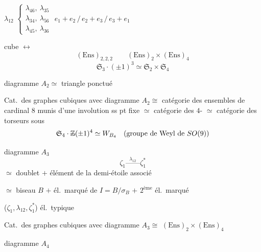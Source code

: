 \documentclass[11pt,a4paper]{article}
\begin{document}


$\lambda_{12}$ \quad
$\left\{\begin{array}{l}\lambda_{46},\ \lambda_{35} \\ \lambda_{34},\ \lambda_{56} \\ \lambda_{45},\ \lambda_{36}\end{array}\right.$
\qquad $e_1 + e_2 \,/\, e_2 + e_3 \,/\, e_3 + e_1$

cube $\longleftrightarrow$ 
\[
(\mathrm{Ens})_{2,2,2} \qquad (\mathrm{Ens})_2 \times (\mathrm{Ens})_4
\]
\[
\mathfrak{S}_3 \cdot (\pm 1)^3 \simeq \mathfrak{S}_2 \times \mathfrak{S}_4
\]


diagramme $A_2 \simeq$ triangle ponctué \struck{\ill{}}

Cat.\ des graphes cubiques avec diagramme $A_2 \cong$ catégorie des ensembles de cardinal $8$ munis d'une involution ss pt fixe $\simeq$ catégorie des $4$- $\simeq$ catégorie des torseurs sous
\[
\mathfrak{S}_4 \cdot \text{\struck{$\mathbb{Z}$}}(\pm 1)^4 \simeq W_{B_4} \quad (\text{groupe de Weyl de } SO(9))
\]

diagramme $A_3$
\[
\zeta_1 \overset{\lambda_{12}}{\text{------}} \zeta_1^*
\]
$\simeq$ doublet $+$ élément de la demi-étoile associé

$\simeq$ biseau $B$ $+$ él.\ marqué de $I = B/\sigma_B$ $+$ $2^{\text{ème}}$ él.\ marqué

($\zeta_1, \lambda_{12}, \zeta_1^*$) él.\ typique

Cat.\ des graphes cubiques avec diagramme $A_3 \cong$  $(\mathrm{Ens})_2 \times (\mathrm{Ens})_4$

diagramme $A_4$
\end{document}
